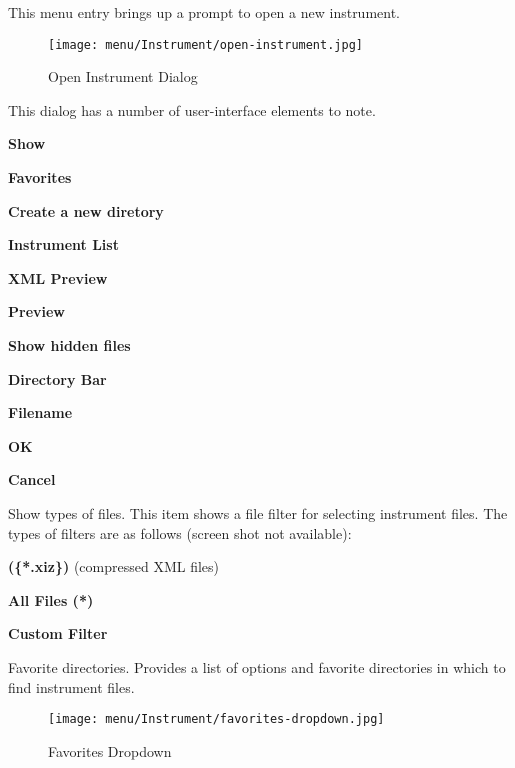    This menu entry brings up a prompt to open a new instrument.

\begin{figure}[H]
   \centering 
   \texttt{[image: menu/Instrument/open-instrument.jpg]}
   \caption{Open Instrument Dialog}
   \label{fig:open_instrument_dialog}
\end{figure}

   This dialog has a number of user-interface elements to note.

   \begin{enumber}
      \item \textbf{Show}
      \item \textbf{Favorites}
      \item \textbf{Create a new diretory}
      \item \textbf{Instrument List}
      \item \textbf{XML Preview}
      \item \textbf{Preview}
      \item \textbf{Show hidden files}
      \item \textbf{Directory Bar}
      \item \textbf{Filename}
      \item \textbf{OK}
      \item \textbf{Cancel}
   \end{enumber}

   \setcounter{ItemCounter}{0}      %

   Show types of files.
   This item shows a file filter for selecting instrument files.
   The types of filters are as follows (screen shot not available):

   \begin{enumber}
      \item \textbf{(\{*.xiz\})} (compressed XML files)
      \item \textbf{All Files (*)}
      \item \textbf{Custom Filter}
   \end{enumber}

   Favorite directories.
   Provides a list of options and favorite directories in which to find 
   instrument files.

\begin{figure}[H]
   \centering 
   \texttt{[image: menu/Instrument/favorites-dropdown.jpg]}
   \caption{Favorites Dropdown}
   \label{fig:open_instrument_favorites}
\end{figure}

